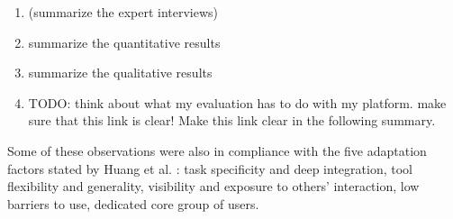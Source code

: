 	\begin{enumerate}
	\item (summarize the expert interviews)
	\item summarize the quantitative results
	\item summarize the qualitative results 
	\item TODO: think about what my evaluation has to do with my platform. make sure that this link is clear! Make this link clear in the following summary.
	\end{enumerate}


	Some of these observations were also in compliance with the five adaptation factors stated by Huang et al. \cite{Huang2004}: task specificity and deep integration, tool flexibility and generality, visibility and exposure to others' interaction, low barriers to use, dedicated core group of users.

